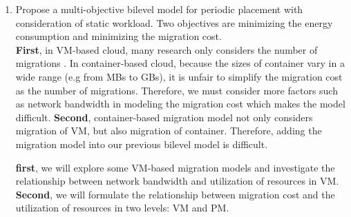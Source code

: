 \begin{enumerate}
	\item Propose a multi-objective bilevel model for periodic placement with consideration of static workload.  Two objectives are minimizing the energy consumption and minimizing the migration cost. \\

	\textbf{First}, in VM-based cloud, many research only considers the number of migrations \cite{Murtazaev:2014eo}. In container-based cloud, because the sizes of container vary in a wide range (e.g from MBs to GBs), it is unfair to simplify the migration cost as the number of migrations. Therefore, we must consider more factors such as network bandwidth in modeling the migration cost which makes the model difficult. \textbf{Second}, container-based migration model not only considers migration of VM, but also migration of container. Therefore, adding the migration model into our previous bilevel model is difficult. 

	 \textbf{first}, we will explore some VM-based migration models and investigate the relationship between network bandwidth and utilization of resources in VM. \textbf{Second}, we will formulate the relationship between migration cost and the utilization of resources in two levels: VM and PM. 




\end{enumerate}
